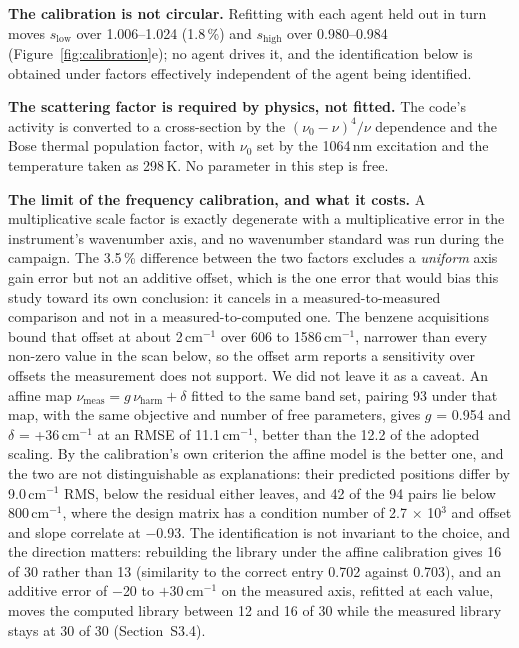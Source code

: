 \documentclass[review,12pt]{elsarticle}
\newcommand*\wn{\ensuremath{\text{cm}^{-1}}}
\begin{document}
\textbf{The calibration is not circular.} Refitting with each agent held out in turn moves
$s_{\mathrm{low}}$ over 1.006--1.024 (1.8\,\%) and $s_{\mathrm{high}}$ over 0.980--0.984
(Figure~\ref{fig:calibration}e); no agent drives it, and the identification below is
obtained under factors effectively independent of the agent being identified.

\textbf{The scattering factor is required by physics, not fitted.} The code's activity is
converted to a cross-section by the $(\nu_0-\nu)^4/\nu$ dependence and the Bose thermal
population factor, with $\nu_0$ set by the 1064\,nm excitation and the temperature taken as
298\,K. No parameter in this step is free.

\textbf{The limit of the frequency calibration, and what it costs.} A multiplicative scale
factor is exactly degenerate with a multiplicative error in the instrument's wavenumber
axis, and no wavenumber standard was run during the campaign. The 3.5\,\% difference between
the two factors excludes a \textit{uniform} axis gain error but not an additive offset,
which is the one error that would bias this study toward its own conclusion: it cancels in a
measured-to-measured comparison and not in a measured-to-computed one. The benzene
acquisitions bound that offset at about 2\,\wn{} over 606 to 1586\,\wn{}, narrower than
every non-zero value in the scan below, so the offset arm reports a sensitivity over
offsets the measurement does not support. We did not leave it as a caveat. An affine map
$\nu_\mathrm{meas} = g\,\nu_\mathrm{harm} + \delta$ fitted to the same band set, pairing 93
under that map, with the same objective and number of free parameters, gives $g$ = 0.954 and
$\delta$ = +36\,\wn{} at an RMSE of 11.1\,\wn{}, better than the 12.2 of the adopted scaling.
By the calibration's own criterion the affine model is the better one, and the two are not
distinguishable as explanations: their predicted positions differ by 9.0\,\wn{} RMS, below
the residual either leaves, and 42 of the 94 pairs lie below 800\,\wn{}, where the design
matrix has a condition number of 2.7 $\times$ 10$^{3}$ and offset and slope correlate at
$-$0.93. The identification is not invariant to the choice, and the direction matters:
rebuilding the library under the affine calibration gives 16 of 30 rather than 13 (similarity
to the correct entry 0.702 against 0.703), and an additive error of $-$20 to $+$30\,\wn{}
on the measured axis, refitted at each value, moves the computed library between 12 and 16
of 30 while the measured library stays at 30 of 30 (Section~S3.4).
\end{document}
